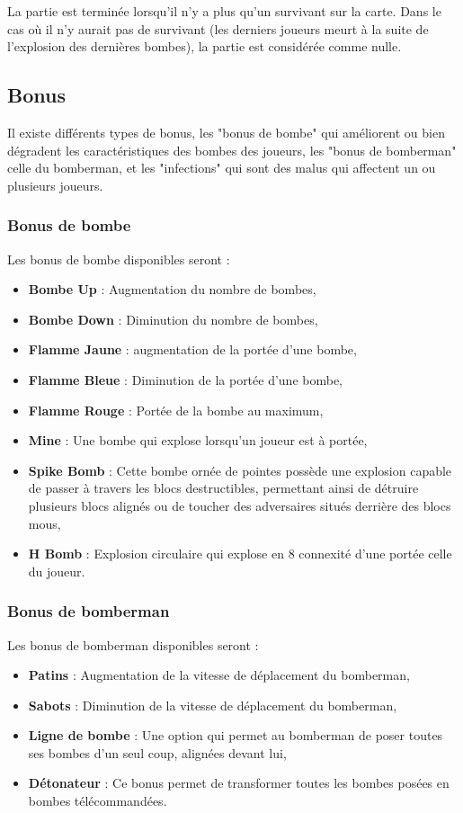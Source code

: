 La partie est terminée lorsqu'il n'y a plus qu'un survivant sur la carte. Dans le cas où il n'y aurait pas de survivant (les derniers joueurs meurt à la suite de l'explosion des dernières bombes), la partie est considérée comme nulle.

\subsection{Bonus}

Il existe différents types de bonus, les "bonus de bombe" qui améliorent ou bien dégradent les caractéristiques des bombes des joueurs, les "bonus de bomberman" celle du bomberman, et les "infections" qui sont des malus qui affectent un ou plusieurs joueurs.

\subsubsection{Bonus de bombe}

Les bonus de bombe disponibles seront :
\begin{itemize}
\item \textbf{Bombe Up} : Augmentation du nombre de bombes,
\item \textbf{Bombe Down} : Diminution du nombre de bombes,
\item \textbf{Flamme Jaune} : augmentation de la portée d'une bombe,
\item \textbf{Flamme Bleue} : Diminution de la portée d'une bombe,
\item \textbf{Flamme Rouge} : Portée de la bombe au maximum,
\item \textbf{Mine} : Une bombe qui explose lorsqu'un joueur est à portée,
\item \textbf{Spike Bomb} : Cette bombe ornée de pointes possède une explosion capable de passer à travers les blocs destructibles, permettant ainsi de détruire plusieurs blocs alignés ou de toucher des adversaires situés derrière des blocs mous,
\item \textbf{H Bomb} : Explosion circulaire qui explose en 8 connexité d'une portée celle du joueur.
\end{itemize}

\subsubsection{Bonus de bomberman}

Les bonus de bomberman disponibles seront :
\begin{itemize}
\item \textbf{Patins} : Augmentation de la vitesse de déplacement du bomberman,
\item \textbf{Sabots} : Diminution de la vitesse de déplacement du bomberman,
\item \textbf{Ligne de bombe} : Une option qui permet au bomberman de poser toutes ses bombes d'un seul coup, alignées devant lui,
\item \textbf{Détonateur} : Ce bonus permet de transformer toutes les bombes posées en bombes télécommandées.
\end{itemize}

